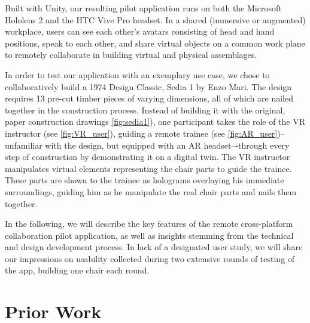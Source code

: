 \documentclass[10pt,twocolumn,letterpaper,english]{article}
\begin{document}
Built with Unity, our resulting pilot application runs on both the Microsoft Hololens 2 and the HTC Vive Pro headset. In a shared (immersive or augmented) workplace, users can see each other's avatars consisting of head and hand positions, speak to each other, and share virtual objects on a common work plane to remotely collaborate in building virtual and physical assemblages.

In order to test our application with an exemplary use case, we chose to collaboratively build a 1974 Design Classic, Sedia 1 by Enzo Mari. The design requires 13 pre-cut timber pieces of varying dimensions, all of which are nailed together in the construction process. Instead of building it with the original, paper construction drawings \cref{fig:sedia1}), one participant takes the role of the VR instructor (see \cref{fig:VR_user}), guiding a remote trainee (see \cref{fig:AR_user})--unfamiliar with the design, but equipped with an AR headset–-through every step of construction by demonstrating it on a digital twin. The VR instructor manipulates virtual elements representing the chair parts to guide the trainee. These parts are shown to the trainee as holograms overlaying his immediate surroundings, guiding him as he manipulate the real chair parts and nails them together.

In the following, we will describe the key features of the remote cross-platform collaboration pilot application, as well as insights stemming from the technical and design development process. In lack of a designated user study, we will share our impressions on usability collected during two extensive rounds of testing of the app, building one chair each round.

\section{Prior Work}\label{sec:prior_work}
\end{document}
